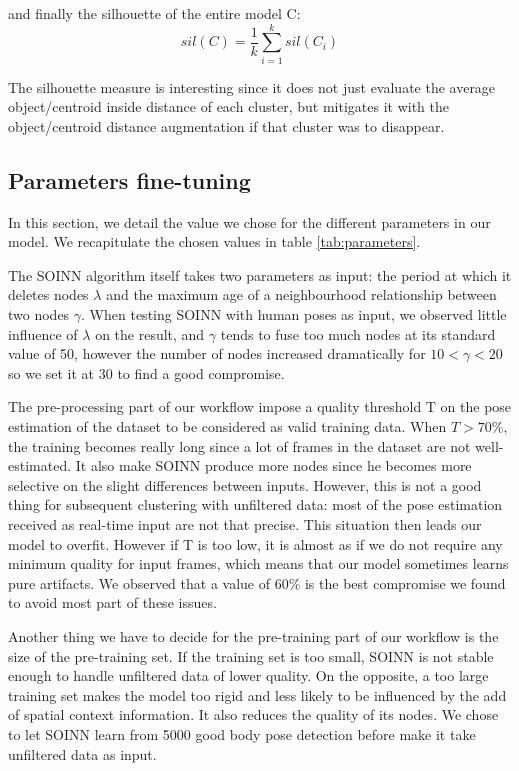 and finally the silhouette of the entire model C:
\begin{equation}
    sil(C)= \frac{1}{k} \sum_{i=1}^k sil(C_i)
\end{equation}

The silhouette measure is interesting since it does not just evaluate the average object/centroid inside distance of each cluster, but mitigates it with the object/centroid distance augmentation if that cluster was to disappear.

\subsection{Parameters fine-tuning}
In this section, we detail the value we chose for the different parameters in our model. We recapitulate the chosen values in table \ref{tab:parameters}.

The SOINN algorithm itself takes two parameters as input: the period at which it deletes nodes $\lambda$ and the maximum age of a neighbourhood relationship between two nodes $\gamma$. When testing SOINN with human poses as input, we observed little influence of $\lambda$ on the result, and $\gamma$ tends to fuse too much nodes at its standard value of 50, however the number of nodes increased dramatically for $10 < \gamma < 20$ so we set it at 30 to find a good compromise.

The pre-processing part of our workflow impose a quality threshold T on the pose estimation of the dataset to be considered as valid training data. When $T > 70\%$, the training becomes really long since a lot of frames in the dataset are not well-estimated. It also make SOINN produce more nodes since he becomes more selective on the slight differences between inputs. However, this is not a good thing for subsequent clustering with unfiltered data: most of the pose estimation received as real-time input are not that precise. This situation then leads our model to overfit.
However if T is too low, it is almost as if we do not require any minimum quality for input frames, which means that our model sometimes learns pure artifacts. We observed that a value of 60\% is the best compromise we found to avoid most part of these issues.

Another thing we have to decide for the pre-training part of our workflow is the size of the pre-training set. If the training set is too small, SOINN is not stable enough to handle unfiltered data of lower quality. On the opposite, a too large training set makes the model too rigid and less likely to be influenced by the add of spatial context information. It also reduces the quality of its nodes. We chose to let SOINN learn from 5000 good body pose detection before make it take unfiltered data as input.

